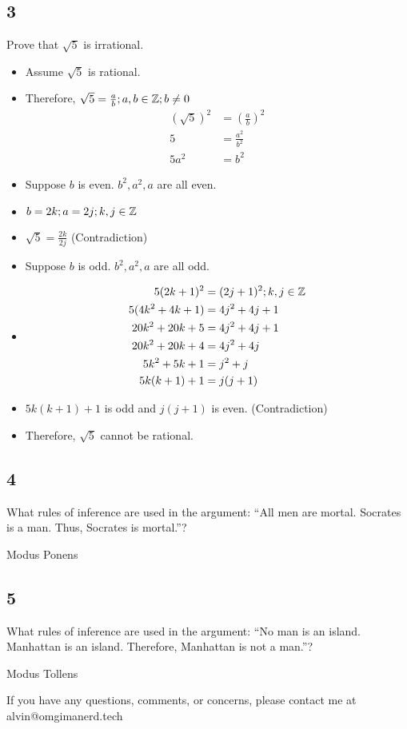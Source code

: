 \documentclass{math}
\begin{document}
\subsection*{3}
Prove that \( \sqrt{5} \) is irrational.
\begin{itemize}
  \item Assume \( \sqrt{5} \) is rational.
  \item Therefore, \( \sqrt{5} = \frac{a}{b}; a,b\in\mathbb{Z}; b\neq 0 \)
    \begin{align*}
      (\sqrt{5})^{2} &= (\frac{a}{b})^{2} \\
      5 &= \frac{a^{2}}{b^{2}} \\
      5a^{2} &= b^{2}
    \end{align*}
  \item Suppose \( b \) is even. \( b^{2}, a^{2}, a \) are all even.
  \item \( b = 2k; a = 2j; k,j\in\mathbb{Z} \)
  \item \( \sqrt{5} = \frac{2k}{2j} \) (Contradiction)
  \item Suppose \( b \) is odd. \( b^{2}, a^{2}, a \) are all odd.
  \item
    \begin{align*}
      5(2k+1)^{2} &= (2j+1)^{2}; k,j\in\mathbb{Z} \\
      5(4k^{2}+4k+1) &= 4j^{2}+4j+1 \\
      20k^{2}+20k+5 &= 4j^{2}+4j+1 \\
      20k^{2}+20k+4 &= 4j^{2}+4j \\
      5k^{2}+5k+1 &= j^{2}+j \\
      5k(k+1)+1 &= j(j+1)
    \end{align*}
  \item \( 5k(k+1)+1 \) is odd and \( j(j+1) \) is even. (Contradiction)
  \item Therefore, \( \sqrt{5} \) cannot be rational.
\end{itemize}

\subsection*{4}
What rules of inference are used in the argument: ``All men are mortal. Socrates
is a man. Thus, Socrates is mortal.''? \par
Modus Ponens

\subsection*{5}
What rules of inference are used in the argument: ``No man is an island.
Manhattan is an island. Therefore, Manhattan is not a man.''? \par
Modus Tollens

\begin{center}
  If you have any questions, comments, or concerns, please contact me at
  alvin@omgimanerd.tech
\end{center}
\end{document}
